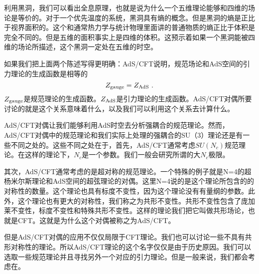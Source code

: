 利用黑洞，我们可以看出全息原理，也就是说为什么一个五维理论能够和四维的场论是等价的。对于一个优先温度的系统，黑洞具有熵的概念。但是黑洞的熵是正比于视界面积的。这个和通常热力学与统计物理里面讲的普通物质的熵正比于体积是完全不同的。但是五维的面积事实上是四维的体积。这预示着如果一个黑洞能被四维的场论所描述，这个黑洞一定处在五维的时空。

如果我们把上面两个陈述写得更明确：AdS/CFT说明，规范场论和AdS空间的引力理论的生成函数是相等的
\begin{equation}
Z_{\rm gauge}=Z_{\rm AdS}~.
\end{equation}
$Z_{\rm gauge}$是规范理论的生成函数。$Z_{\rm AdS}$是引力理论的生成函数。AdS/CFT对偶所要讨论的就是这个关系意味着什么，以及我们可以利用这个关系去计算什么。

AdS/CFT对偶让我们能够利用AdS时空去分析强耦合的规范理论。然而，AdS/CFT对偶中的规范理论和我们实际上处理的强耦合的SU（3）理论还是有一些不同之处的。这些不同之处在于，首先，AdS/CFT通常考虑$SU(N_c)$规范理论。在这样的理论下，$N_c$是一个参数。我们一般会研究所谓的大$N_c$极限。

其次，AdS/CFT通常考虑的是超对称的规范理论。一个特殊的例子就是N=4的超杨米尔斯理论和AdS空间的超弦理论的对偶。这里N=4说的是这个理论所包含的的对称性的数量。这个理论也具有标度不变性，因为这个理论没有有量纲的参数。此外，这个理论也有更大的对称性，我们称之为共形不变性。共形不变性包含了庞加莱不变性，标度不变性和特殊共形不变性。这样的理论我们把它叫做共形场论，也就是CFT。这就是为什么这个对偶被称之为AdS/CFT。

但是AdS/CFT对偶的应用不仅仅局限于CFT理论。我们也可以讨论一些不具有共形对称性的理论。所以AdS/CFT理论的这个名字仅仅是由于历史原因。我们可以选取一些规范理论并且寻找另外一个对应的引力理论。但是一般来说，我们都会考虑在。

